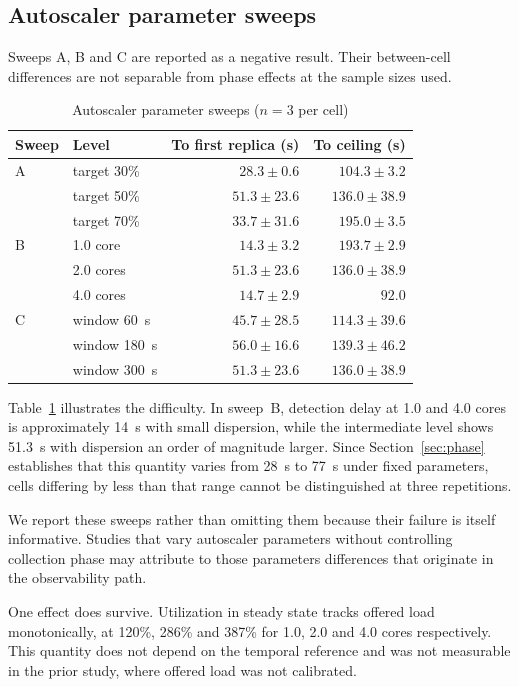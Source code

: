 \documentclass[conference]{IEEEtran}
\begin{document}
\subsection{Autoscaler parameter sweeps}

Sweeps A, B and C are reported as a negative result. Their between-cell
differences are not separable from phase effects at the sample sizes used.

\begin{table}[ht]
\caption{Autoscaler parameter sweeps ($n=3$ per cell)}
\label{tab:abc}
\centering
\small
\begin{tabular}{@{}llrr@{}}
\toprule
Sweep & Level & To first replica (s) & To ceiling (s) \\
\midrule
\multirow{1}{*}{A} & target 30\% & $28.3 \pm 0.6$ & $104.3 \pm 3.2$ \\
 & target 50\% & $51.3 \pm 23.6$ & $136.0 \pm 38.9$ \\
 & target 70\% & $33.7 \pm 31.6$ & $195.0 \pm 3.5$ \\
\midrule
\multirow{1}{*}{B} & 1.0 core & $14.3 \pm 3.2$ & $193.7 \pm 2.9$ \\
 & 2.0 cores & $51.3 \pm 23.6$ & $136.0 \pm 38.9$ \\
 & 4.0 cores & $14.7 \pm 2.9$ & $92.0$ \\
\midrule
\multirow{1}{*}{C} & window 60~s & $45.7 \pm 28.5$ & $114.3 \pm 39.6$ \\
 & window 180~s & $56.0 \pm 16.6$ & $139.3 \pm 46.2$ \\
 & window 300~s & $51.3 \pm 23.6$ & $136.0 \pm 38.9$ \\
\bottomrule
\end{tabular}
\end{table}

Table~\ref{tab:abc} illustrates the difficulty. In sweep~B, detection delay at
1.0 and 4.0 cores is approximately 14~s with small dispersion, while the
intermediate level shows 51.3~s with dispersion an order of magnitude larger.
Since Section~\ref{sec:phase} establishes that this quantity varies from 28~s to
77~s under fixed parameters, cells differing by less than that range cannot be
distinguished at three repetitions.

We report these sweeps rather than omitting them because their failure is
itself informative. Studies that vary autoscaler parameters without controlling
collection phase may attribute to those parameters differences that originate in
the observability path.

One effect does survive. Utilization in steady state tracks offered load
monotonically, at 120\%, 286\% and 387\% for 1.0, 2.0 and 4.0 cores
respectively. This quantity does not depend on the temporal reference and was
not measurable in the prior study, where offered load was not calibrated.
\end{document}
